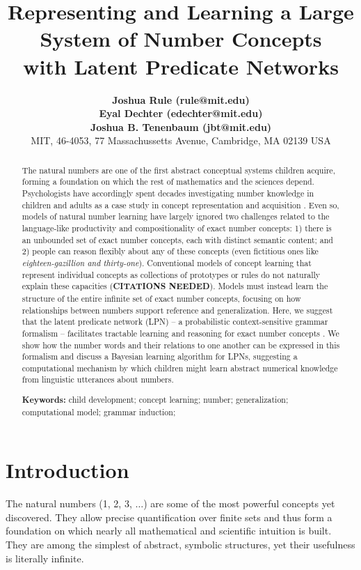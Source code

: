 \documentclass[10pt,letterpaper]{article}
\title{Representing and Learning a Large System of Number Concepts \\ with Latent Predicate Networks}
\author{
  {\large \bf Joshua Rule (rule@mit.edu)}\\
  {\large \bf Eyal Dechter (edechter@mit.edu)}\\
  {\large \bf Joshua B. Tenenbaum (jbt@mit.edu)}\\
  MIT, 46-4053, 77 Massachussetts Avenue, Cambridge, MA 02139 USA}
\begin{document}
\maketitle

\begin{abstract}
  The natural numbers are one of the first abstract conceptual systems
  children acquire, forming a foundation on which the rest of
  mathematics and the sciences depend. Psychologists have accordingly
  spent decades investigating number knowledge in children and adults
  as a case study in concept representation and acquisition
  \citep{fuson1988children,galGel2005,Car2009}. Even so, models of
  natural number learning have largely ignored two challenges related
  to the language-like productivity and compositionality of exact
  number concepts: 1) there is an unbounded set of exact number
  concepts, each with distinct semantic content; and 2) people can
  reason flexibly about any of these concepts (even fictitious ones
  like \emph{eighteen-gazillion and thirty-one}). Conventional models
  of concept learning that represent individual concepts as
  collections of prototypes or rules do not naturally explain these
  capacities ({\bf CITATIONS NEEDED}). Models must instead learn the
  structure of the entire infinite set of exact number concepts,
  focusing on how relationships between numbers support reference and
  generalization. Here, we suggest that the latent predicate network
  (LPN) -- a probabilistic context-sensitive grammar formalism --
  facilitates tractable learning and reasoning for exact number
  concepts \citep{DecRulTenming}. We show how the number words and
  their relations to one another can be expressed in this formalism
  and discuss a Bayesian learning algorithm for LPNs, suggesting a
  computational mechanism by which children might learn abstract
  numerical knowledge from linguistic utterances about numbers.

  \textbf{Keywords:}
  child development; concept learning; number; generalization;
  computational model; grammar induction;
\end{abstract}

\section{Introduction}

The natural numbers (1, 2, 3, $\ldots$) are some of the most powerful
concepts yet discovered. They allow precise quantification over finite
sets and thus form a foundation on which nearly all mathematical and
scientific intuition is built. They are among the simplest of
abstract, symbolic structures, yet their usefulness is literally
infinite.
\end{document}
